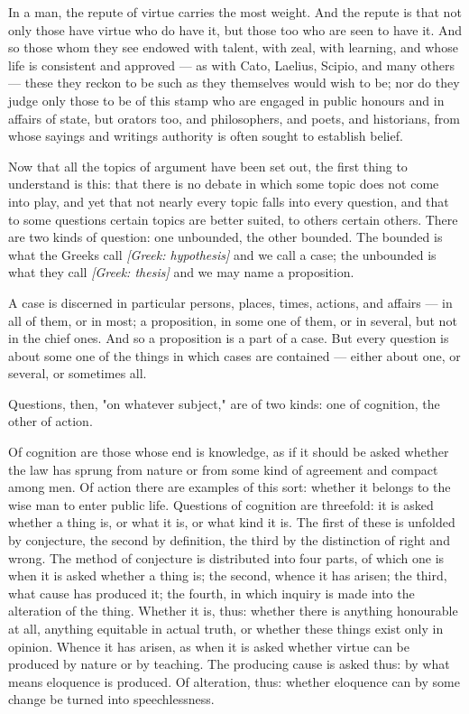  In a man, the repute of virtue carries the most weight. And the repute is that not only those have virtue who do have it, but those too who are seen to have it. And so those whom they see endowed with talent, with zeal, with learning, and whose life is consistent and approved — as with Cato, Laelius, Scipio, and many others — these they reckon to be such as they themselves would wish to be; nor do they judge only those to be of this stamp who are engaged in public honours and in affairs of state, but orators too, and philosophers, and poets, and historians, from whose sayings and writings authority is often sought to establish belief.

 Now that all the topics of argument have been set out, the first thing to understand is this: that there is no debate in which some topic does not come into play, and yet that not nearly every topic falls into every question, and that to some questions certain topics are better suited, to others certain others. There are two kinds of question: one unbounded, the other bounded. The bounded is what the Greeks call \textit{[Greek: hypothesis]} and we call a case; the unbounded is what they call \textit{[Greek: thesis]} and we may name a proposition.

 A case is discerned in particular persons, places, times, actions, and affairs — in all of them, or in most; a proposition, in some one of them, or in several, but not in the chief ones. And so a proposition is a part of a case. But every question is about some one of the things in which cases are contained — either about one, or several, or sometimes all.

 Questions, then, "on whatever subject," are of two kinds: one of cognition, the other of action.

 Of cognition are those whose end is knowledge, as if it should be asked whether the law has sprung from nature or from some kind of agreement and compact among men. Of action there are examples of this sort: whether it belongs to the wise man to enter public life. Questions of cognition are threefold: it is asked whether a thing is, or what it is, or what kind it is. The first of these is unfolded by conjecture, the second by definition, the third by the distinction of right and wrong. The method of conjecture is distributed into four parts, of which one is when it is asked whether a thing is; the second, whence it has arisen; the third, what cause has produced it; the fourth, in which inquiry is made into the alteration of the thing. Whether it is, thus: whether there is anything honourable at all, anything equitable in actual truth, or whether these things exist only in opinion. Whence it has arisen, as when it is asked whether virtue can be produced by nature or by teaching. The producing cause is asked thus: by what means eloquence is produced. Of alteration, thus: whether eloquence can by some change be turned into speechlessness.

